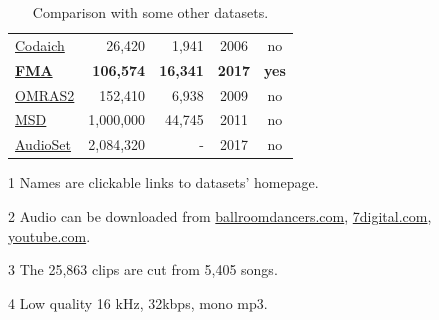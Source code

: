\documentclass{article}
\newcommand{\ntracks}{106,574 }
\newcommand{\nartists}{16,341 }
\begin{document}
\begin{table}[t]
\begin{threeparttable}
\begin{tabular}{l@{ }rrcc}
		\href{http://jmir.sourceforge.net/index_Codaich.html}{Codaich} \cite{codaich} & 26,420 & 1,941 & 2006 & no \\ %
		\bf \href{https://github.com/mdeff/fma/}{FMA} & \bf \ntracks & \bf \nartists & \bf 2017 & \bf yes \\
		\href{http://www.omras2.org/}{OMRAS2} \cite{omras} & 152,410 & 6,938 & 2009 & no \\
		\href{https://labrosa.ee.columbia.edu/millionsong/}{MSD} \cite{msd} & 1,000,000 & 44,745 & 2011 & no\tnote{2} \\
		\href{https://research.google.com/audioset/}{AudioSet} \cite{audioset} & 2,084,320 & - & 2017 & no\tnote{2} \\
		\bottomrule
	\end{tabular}
	\begin{tablenotes}
		\item[1] Names are clickable links to datasets' homepage.
		\item[2] Audio can be downloaded from \href{http://www.ballroomdancers.com}{ballroomdancers.com}, \href{https://www.7digital.com}{7digital.com}, \href{https://www.youtube.com}{youtube.com}.
		\item[3] The 25,863 clips are cut from 5,405 songs.
		\item[4] Low quality 16 kHz, 32kbps, mono mp3.
	\end{tablenotes}
	\end{threeparttable}
	\caption{Comparison with some other datasets.} %
	\label{tab:datasets}
\end{table}
\end{document}
